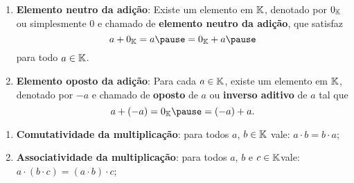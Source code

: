\documentclass{beamer}
\begin{document}
    \begin{frame}
        \begin{definicao}
            \begin{enumerate}[label={\roman*})]
                \conti
		\item \textbf{Elemento neutro da adi\c{c}\~ao}: Existe um elemento em $\mathbb{K}$, denotado por $0_{\mathbb{K}}$ \pause ou simplesmente $0$ e chamado de \textbf{elemento neutro da adi\c{c}\~ao}, \pause que satisfaz\pause
		\[
                    a + 0_\cp{K} = a\pause = 0_\cp{K} + a\pause
		\]
		para todo $a \in \mathbb{K}$.\pause
		\item \textbf{Elemento oposto da adi\c{c}\~ao}: Para cada $a \in \mathbb{K}$, \pause existe um elemento em $\mathbb{K}$, denotado por $-a$ \pause e chamado de \textbf{oposto} de $a$ \pause ou \textbf{inverso aditivo} de $a$ tal que\pause
		\[
                    a + (-a) = 0_\cp{K}\pause = (-a) + a.
		\]

                \seti
            \end{enumerate}
        \end{definicao}
    \end{frame}
    
    \begin{frame}
        \begin{definicao}
            \begin{enumerate}[label={\roman*})]
                \conti

		\item \textbf{Comutatividade da multiplica\c{c}\~ao}: para todos $a$, $b \in \mathbb{K}$ \pause vale: $a \cdot b = b \cdot a$;\pause
		\item \textbf{Associatividade da multiplica\c{c}\~ao}: para todos $a$, $b$ e $c \in \mathbb{K}$\pause vale: $a \cdot (b \cdot c) = (a \cdot b) \cdot c$;\pause
	
                \seti
            \end{enumerate}
        \end{definicao}
    \end{frame}
    
\end{document}
